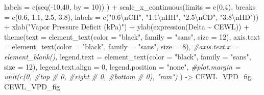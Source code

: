 \documentclass[
]{article}
\newenvironment{Shaded}{\begin{snugshade}}{\end{snugshade}}
\newcommand{\AttributeTok}[1]{\textcolor[rgb]{0.77,0.63,0.00}{#1}}
\newcommand{\CommentTok}[1]{\textcolor[rgb]{0.56,0.35,0.01}{\textit{#1}}}
\newcommand{\DecValTok}[1]{\textcolor[rgb]{0.00,0.00,0.81}{#1}}
\newcommand{\FloatTok}[1]{\textcolor[rgb]{0.00,0.00,0.81}{#1}}
\newcommand{\FunctionTok}[1]{\textcolor[rgb]{0.00,0.00,0.00}{#1}}
\newcommand{\NormalTok}[1]{#1}
\newcommand{\OtherTok}[1]{\textcolor[rgb]{0.56,0.35,0.01}{#1}}
\newcommand{\SpecialCharTok}[1]{\textcolor[rgb]{0.00,0.00,0.00}{#1}}
\newcommand{\StringTok}[1]{\textcolor[rgb]{0.31,0.60,0.02}{#1}}
\begin{document}
\begin{Shaded}
\begin{Highlighting}[]
                     \AttributeTok{labels =} \FunctionTok{c}\NormalTok{(}\FunctionTok{seq}\NormalTok{(}\SpecialCharTok{{-}}\DecValTok{10}\NormalTok{,}\DecValTok{40}\NormalTok{, }\AttributeTok{by =} \DecValTok{10}\NormalTok{))}
\NormalTok{                     ) }\SpecialCharTok{+}
  \FunctionTok{scale\_x\_continuous}\NormalTok{(}\AttributeTok{limits =} \FunctionTok{c}\NormalTok{(}\DecValTok{0}\NormalTok{,}\DecValTok{4}\NormalTok{),}
                     \AttributeTok{breaks =} \FunctionTok{c}\NormalTok{(}\FloatTok{0.6}\NormalTok{, }\FloatTok{1.1}\NormalTok{, }\FloatTok{2.5}\NormalTok{, }\FloatTok{3.8}\NormalTok{),}
                     \AttributeTok{labels =} \FunctionTok{c}\NormalTok{(}\StringTok{"0.6}\SpecialCharTok{\textbackslash{}n}\StringTok{CH"}\NormalTok{, }
                                \StringTok{"1.1}\SpecialCharTok{\textbackslash{}n}\StringTok{HH"}\NormalTok{, }
                                \StringTok{"2.5}\SpecialCharTok{\textbackslash{}n}\StringTok{CD"}\NormalTok{, }
                                \StringTok{"3.8}\SpecialCharTok{\textbackslash{}n}\StringTok{HD"}\NormalTok{)) }\SpecialCharTok{+}
  \FunctionTok{xlab}\NormalTok{(}\StringTok{"Vapor Pressure Deficit (kPa)"}\NormalTok{) }\SpecialCharTok{+} 
  \FunctionTok{ylab}\NormalTok{(}\FunctionTok{expression}\NormalTok{(Delta }\SpecialCharTok{\textasciitilde{}} \StringTok{\textquotesingle{}CEWL\textquotesingle{}}\NormalTok{)) }\SpecialCharTok{+} 
  \FunctionTok{theme}\NormalTok{(}\AttributeTok{text =} \FunctionTok{element\_text}\NormalTok{(}\AttributeTok{color =} \StringTok{"black"}\NormalTok{, }
                            \AttributeTok{family =} \StringTok{"sans"}\NormalTok{, }
                            \AttributeTok{size =} \DecValTok{12}\NormalTok{),}
        \AttributeTok{axis.text =} \FunctionTok{element\_text}\NormalTok{(}\AttributeTok{color =} \StringTok{"black"}\NormalTok{, }
                                 \AttributeTok{family =} \StringTok{"sans"}\NormalTok{, }
                                 \AttributeTok{size =} \DecValTok{8}\NormalTok{),}
        \CommentTok{\#axis.text.x = element\_blank(),}
        \AttributeTok{legend.text =} \FunctionTok{element\_text}\NormalTok{(}\AttributeTok{color =} \StringTok{"black"}\NormalTok{, }
                                 \AttributeTok{family =} \StringTok{"sans"}\NormalTok{, }
                                 \AttributeTok{size =} \DecValTok{12}\NormalTok{),}
        \AttributeTok{legend.text.align =} \DecValTok{0}\NormalTok{,}
        \AttributeTok{legend.position =} \StringTok{"none"}\NormalTok{,}
        \CommentTok{\#plot.margin = unit(c(0, \#top}
         \CommentTok{\#                     0, \#right}
          \CommentTok{\#                    0, \#bottom}
           \CommentTok{\#                   0), "mm")}
\NormalTok{        ) }\OtherTok{{-}\textgreater{}}\NormalTok{ CEWL\_VPD\_fig}
\NormalTok{CEWL\_VPD\_fig}
\end{Highlighting}
\end{Shaded}
\end{document}
